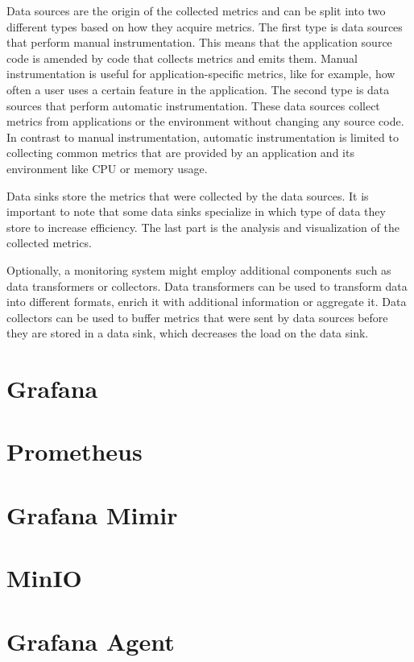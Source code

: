 Data sources are the origin of the collected metrics and can be split into two different types
based on how they acquire metrics. The first type is data sources that perform manual instrumentation.
This means that the application source code is amended by code that collects metrics and emits them.
Manual instrumentation is useful for application-specific metrics, like for example, how often a user
uses a certain feature in the application.
The second type is data sources that perform automatic instrumentation.
These data sources collect metrics from applications or the environment without changing any source code.
In contrast to manual instrumentation, automatic instrumentation is limited to collecting
common metrics that are provided by an application and its environment like CPU or memory usage.

Data sinks store the metrics that were collected by the data sources.
It is important to note that some data sinks specialize in which type of data they store
to increase efficiency. The last part is the analysis and visualization of the collected metrics.

Optionally, a monitoring system might employ additional components such as data transformers or collectors.
Data transformers can be used to transform data into different formats, enrich it with additional information
or aggregate it.
Data collectors can be used to buffer metrics that were sent by data sources before they are stored in a data sink,
which decreases the load on the data sink.

\section{Grafana}

\section{Prometheus}

\section{Grafana Mimir}

\section{MinIO}

\section{Grafana Agent}
